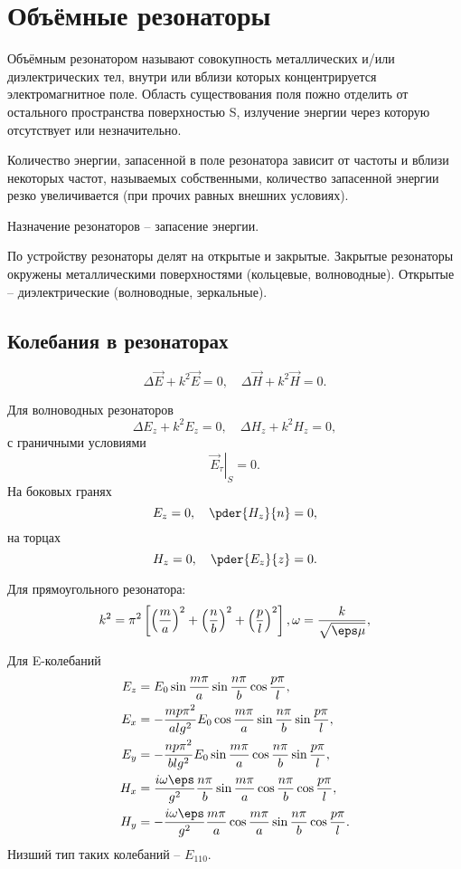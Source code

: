\chapter{Объёмные резонаторы}

Объёмным резонатором называют совокупность металлических и/или диэлектрических тел, внутри или вблизи которых концентрируется электромагнитное поле. Область существования поля пожно отделить от остального пространства поверхностью S, излучение энергии через которую отсутствует или незначительно.

Количество энергии, запасенной в поле резонатора зависит от частоты и вблизи некоторых частот, называемых собственными, количество запасенной энергии резко увеличивается (при прочих равных внешних условиях).

Назначение резонаторов -- запасение энергии.

По устройству резонаторы делят на открытые и закрытые. Закрытые резонаторы окружены металлическими поверхностями (кольцевые, волноводные). Открытые -- диэлектрические (волноводные, зеркальные).


\section{Колебания в резонаторах}
\[
	\Delta\vec{E} + k^2\vec{E} = 0,\quad
	\Delta\vec{H} + k^2\vec{H} = 0.
\]

Для волноводных резонаторов
\[
	\Delta E_z + k^2 E_z = 0,\quad
	\Delta H_z + k^2 H_z = 0,
\]
с граничными условиями
\[
	\left.\vec{E}_\tau\right|_S = 0.
\]
На боковых гранях
\[
	E_z = 0,\quad \pder{H_z}{n} = 0,
\]
на торцах
\[
	H_z = 0,\quad \pder{E_z}{z} = 0.
\]

Для прямоугольного резонатора:
\[
	k^2 = \pi^2\left[\left(\frac{m}{a}\right)^2+
					 \left(\frac{n}{b}\right)^2+
					 \left(\frac{p}{l}\right)^2\right],
	\omega = \frac{k}{\sqrt{\eps\mu}},
\]


Для E-колебаний
\begin{align*}
	E_z & = E_0\sin\frac{m\pi}{a}\sin\frac{n\pi}{b}\cos\frac{p\pi}{l},\\
	E_x & = -\frac{mp\pi^2}{al g^2}E_0\cos\frac{m\pi}{a}\sin\frac{n\pi}{b}\sin\frac{p\pi}{l},\\
	E_y & = -\frac{np\pi^2}{bl g^2}E_0\sin\frac{m\pi}{a}\cos\frac{n\pi}{b}\sin\frac{p\pi}{l},\\
	H_x & = \frac{i\omega\eps}{g^2}\frac{n\pi}{b}\sin\frac{m\pi}{a}\cos\frac{n\pi}{b}\cos\frac{p\pi}{l},\\
	H_y & = -\frac{i\omega\eps}{g^2}\frac{m\pi}{a}\cos\frac{m\pi}{a}\sin\frac{n\pi}{b}\cos\frac{p\pi}{l}.
\end{align*}
Низший тип таких колебаний -- \(E_{110}\). 

